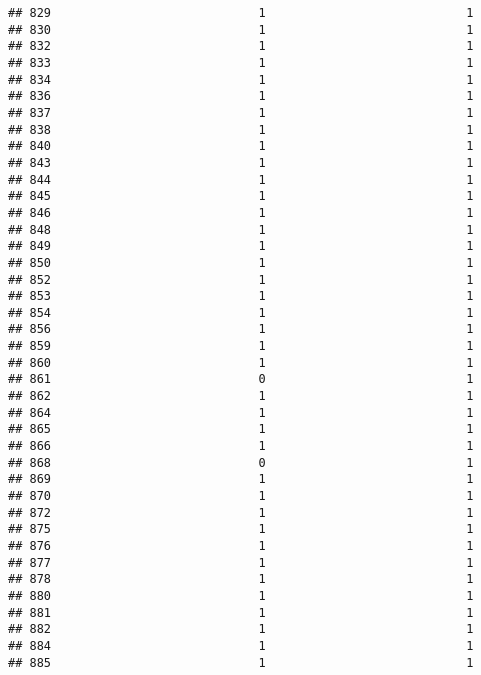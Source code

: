 \documentclass[
]{article}
\begin{document}
\begin{verbatim}
## 829                             1                            1
## 830                             1                            1
## 832                             1                            1
## 833                             1                            1
## 834                             1                            1
## 836                             1                            1
## 837                             1                            1
## 838                             1                            1
## 840                             1                            1
## 843                             1                            1
## 844                             1                            1
## 845                             1                            1
## 846                             1                            1
## 848                             1                            1
## 849                             1                            1
## 850                             1                            1
## 852                             1                            1
## 853                             1                            1
## 854                             1                            1
## 856                             1                            1
## 859                             1                            1
## 860                             1                            1
## 861                             0                            1
## 862                             1                            1
## 864                             1                            1
## 865                             1                            1
## 866                             1                            1
## 868                             0                            1
## 869                             1                            1
## 870                             1                            1
## 872                             1                            1
## 875                             1                            1
## 876                             1                            1
## 877                             1                            1
## 878                             1                            1
## 880                             1                            1
## 881                             1                            1
## 882                             1                            1
## 884                             1                            1
## 885                             1                            1

\end{verbatim}
\end{document}
